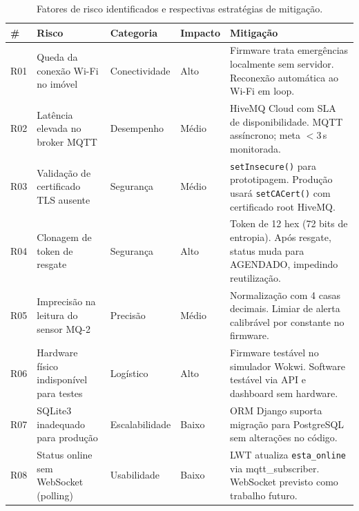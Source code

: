 \documentclass[12pt,a4paper]{article}
\begin{document}
\begin{table}[H]
  \centering
  \small
  \caption{Fatores de risco identificados e respectivas estratégias de mitigação.}
  \label{tab:riscos}
  \begin{tabular}{p{0.7cm} p{3.2cm} p{2.6cm} p{1.6cm} p{5.4cm}}
    \toprule
    \textbf{\#} & \textbf{Risco} & \textbf{Categoria} & \textbf{Impacto} &
    \textbf{Mitigação} \\
    \midrule

    R01 & Queda da conexão Wi-Fi no imóvel &
      Conectividade & Alto &
      Firmware trata emergências localmente sem servidor. Reconexão automática
      ao Wi-Fi em loop. \\[3pt]

    R02 & Latência elevada no broker MQTT &
      Desempenho & Médio &
      HiveMQ Cloud com SLA de disponibilidade. MQTT assíncrono; meta
      $<$3\,s monitorada. \\[3pt]

    R03 & Validação de certificado TLS ausente &
      Segurança & Médio &
      \texttt{setInsecure()} para prototipagem. Produção usará
      \texttt{setCACert()} com certificado root HiveMQ. \\[3pt]

    R04 & Clonagem de token de resgate &
      Segurança & Alto &
      Token de 12 hex (72 bits de entropia). Após resgate, status muda para
      AGENDADO, impedindo reutilização. \\[3pt]

    R05 & Imprecisão na leitura do sensor MQ-2 &
      Precisão & Médio &
      Normalização com 4 casas decimais. Limiar de alerta calibrável por
      constante no firmware. \\[3pt]

    R06 & Hardware físico indisponível para testes &
      Logístico & Alto &
      Firmware testável no simulador Wokwi. Software testável via API e
      dashboard sem hardware. \\[3pt]

    R07 & SQLite3 inadequado para produção &
      Escalabilidade & Baixo &
      ORM Django suporta migração para PostgreSQL sem alterações no código. \\[3pt]

    R08 & Status online sem WebSocket (polling) &
      Usabilidade & Baixo &
      LWT atualiza \texttt{esta\_online} via mqtt\_subscriber.
      WebSocket previsto como trabalho futuro. \\

    \bottomrule
  \end{tabular}
  \par{}
\end{table}

\end{document}

